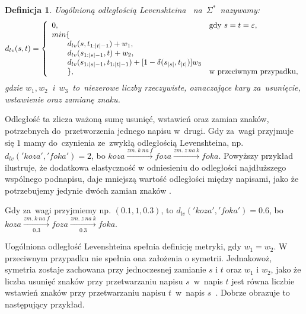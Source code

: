 \documentclass[12pt, twoside, openany]{report}
\theoremstyle{plain}
\newtheorem{defi}{Definicja}[section]
\begin{document}
\begin{defi}
Uogólnioną \emph{odległością Levenshteina} \cite{Levenshtein1965:binarycodes}~na~$\Sigma^*$~nazywamy:
$$
d_{lv}(s, t) = \left\{
\begin{array}{l l}     
    0, & \text{gdy } s = t = \varepsilon,\\
    min\{ & \\
\qquad    d_{lv}(s, t_{1:|t|-1}) + w_1, & \\
\qquad    d_{lv}(s_{1:|s|-1}, t) + w_2, & \\
\qquad    d_{lv}(s_{1:|s|-1}, t_{1:|t|-1}) + [1-\delta(s_{|s|}, t_{|t|})]w_3 & \\
\qquad    \}, & \text{w przeciwnym przypadku},
\end{array}\right.
$$
gdzie $w_1, w_2$~i~$w_3$~to~niezerowe liczby rzeczywiste, oznaczające kary za~usunięcie, wstawienie oraz zamianę znaku.
\end{defi}

Odległość ta zlicza ważoną sumę usunięć, wstawień oraz zamian znaków, potrzebnych do~przetworzenia jednego napisu w~drugi. Gdy za~wagi przyjmuje się $1$ mamy do~czynienia ze~zwykłą odległością Levenshteina, np.~$d_{lv}('koza', 'foka') = 2$, bo $koza  \xrightarrow{zm.\ k\ na\ f} foza  \xrightarrow{zm.\ z\ na\ k} foka$. Powyższy przykład ilustruje, że dodatkowa elastyczność w odniesieniu do odległości najdłuższego wspólnego podnapisu, daje mniejszą wartość odległości między napisami, jako że potrzebujemy jedynie dwóch zamian znaków \cite{Loo2014:stringdist}.

Gdy za~wagi przyjmiemy np. $(0.1, 1, 0.3)$, to $d_{lv}('koza', 'foka') = 0.6$, bo~$koza  \xrightarrow[0.3]{zm.\ k\ na\ f} foza  \xrightarrow[0.3]{zm.\ z\ na\ k} foka$.

Uogólniona odległość Levenshteina spełnia definicję metryki, gdy $w_1 = w_2$. W przeciwnym przypadku nie spełnia ona założenia o symetrii. Jednakowoż, symetria zostaje zachowana przy jednoczesnej zamianie $s$ i $t$ oraz $w_1$ i $w_2$, jako że liczba usunięć znaków przy przetwarzaniu napisu $s$~w~napis $t$ jest równa liczbie wstawień znaków przy przetwarzaniu napisu $t$~w~napis $s$~\cite{Loo2014:stringdist}. Dobrze obrazuje to następujący przykład.
\end{document}
